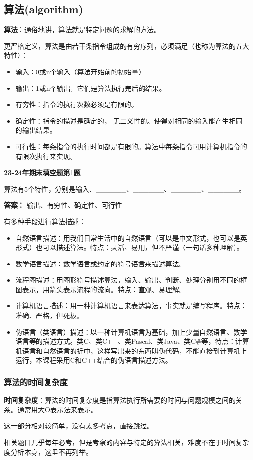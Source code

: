 \documentclass[a4paper]{ltxdoc}
\begin{document}
\subsection{算法(algorithm)}
\par \textbf{算法}：通俗地讲，算法就是特定问题的求解的方法。
\par 更严格定义，算法是由若干条指令组成的有穷序列，必须满足（也称为算法的五大特性）：
\begin{itemize}
    \item 输入：0或n个输入（算法开始前的初始量）
    \item 输出：1或n个输出，它们是算法执行完后的结果。
    \item 有穷性：指令的执行次数必须是有限的。
    \item 确定性：指令的描述是确定的， 无二义性的。使得对相同的输入能产生相同的输出结果。
    \item 可行性：每条指令的执行时间都是有限的。算法中每条指令可用计算机指令的有限次执行来实现。
\end{itemize}
\begin{framed}
    \textbf{23-24年期末填空题第1题}
    \par 算法有5个特性，分别是输入、\_\_\_\_\_\_、\_\_\_\_\_\_、\_\_\_\_\_\_、\_\_\_\_\_\_。
    \par \textbf{答案：} 输出、有穷性、确定性、可行性
\end{framed}
\par 有多种手段进行算法描述：
\begin{itemize}
    \item 自然语言描述：用我们日常生活中的自然语言（可以是中文形式，也可以是英形式）也可以描述算法。特点：灵活、易用，但不严谨（一句话多种理解）。 
    \item 数学语言描述：数学语言或约定的符号语言来描述算法。
    \item 流程图描述：用图形符号描述算法，输入、输出、判断、处理分别用不同的框图表示，用箭头表示流程的流向。特点：直观、易理解。
    \item 计算机语言描述：用一种计算机语言来表达算法，事实就是编写程序。特点：准确、严格，但死板。
    \item 伪语言（类语言）描述：以一种计算机语言为基础，加上少量自然语言、数学语言等的描述方式。类C、类C++、类Pascal、类Java、类C\#等，特点：计算机语言和自然语言的折中，这样写出来的东西叫伪代码，不能直接到计算机上运行，本课程采用C和C++结合的伪语言描述方法。
\end{itemize}

\subsubsection{算法的时间复杂度}
\par \textbf{时间复杂度}：算法的时间复杂度是指算法执行所需要的时间与问题规模之间的关系。通常用大O表示法来表示。
\par 这一部分相对较简单，没有太多考点，直接跳过。
\begin{framed}
    相关题目几乎每年必考，但是考察的内容与特定的算法相关，难度不在于时间复杂度分析本身，这里不再列举。
\end{framed}
\end{document}
